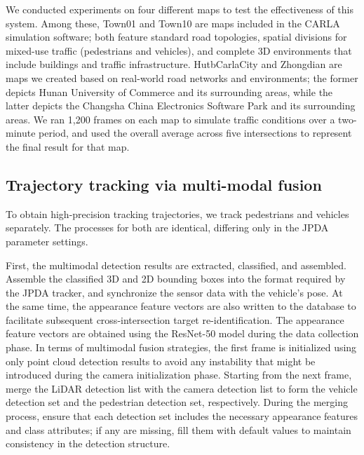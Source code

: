 \documentclass[lineno,pdflatex,sn-basic]{sn-jnl}%
\theoremstyle{thmstyleone}%
\theoremstyle{thmstyletwo}%
\theoremstyle{thmstylethree}%
\begin{document}
We conducted experiments on four different maps to test the effectiveness of this system.
Among these, Town01 and Town10 are maps included in the CARLA simulation software; both feature standard road topologies, spatial divisions for mixed-use traffic (pedestrians and vehicles), and complete 3D environments that include buildings and traffic infrastructure.
HutbCarlaCity and Zhongdian are maps we created based on real-world road networks and environments; the former depicts Hunan University of Commerce and its surrounding areas, while the latter depicts the Changsha China Electronics Software Park and its surrounding areas.
We ran 1,200 frames on each map to simulate traffic conditions over a two-minute period, and used the overall average across five intersections to represent the final result for that map.

\subsection{Trajectory tracking via multi-modal fusion}
To obtain high-precision tracking trajectories, we track pedestrians and vehicles separately. The processes for both are identical, differing only in the JPDA parameter settings.

First, the multimodal detection results are extracted, classified, and assembled.
Assemble the classified 3D and 2D bounding boxes into the format required by the JPDA tracker, and synchronize the sensor data with the vehicle's pose.
At the same time, the appearance feature vectors are also written to the database to facilitate subsequent cross-intersection target re-identification.
The appearance feature vectors are obtained using the ResNet-50 model during the data collection phase.
In terms of multimodal fusion strategies, the first frame is initialized using only point cloud detection results to avoid any instability that might be introduced during the camera initialization phase.
Starting from the next frame, merge the LiDAR detection list with the camera detection list to form the vehicle detection set and the pedestrian detection set, respectively.
During the merging process, ensure that each detection set includes the necessary appearance features and class attributes; if any are missing, fill them with default values to maintain consistency in the detection structure.
\end{document}
